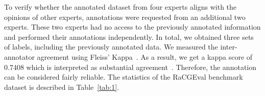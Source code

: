To verify whether the annotated dataset from four experts aligns with the opinions of other experts, annotations were requested from an additional two experts. These two experts had no access to the previously annotated information and performed their annotations independently. In total, we obtained three sets of labels, including the previously annotated data. We measured the inter-annotator agreement using Fleiss' Kappa~\cite{fleiss1971agreement}. As a result, we get a kappa score of 0.7408 which is interpreted as substantial agreement~\cite{landis1977kappascore}. Therefore, the annotation can be considered fairly reliable. The statistics of the RaCGEval benchmark dataset is described in Table~\ref{tab:1}.


